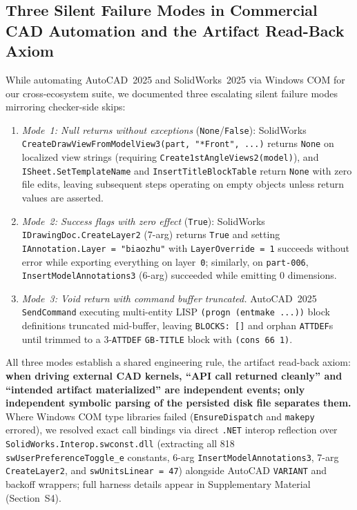 \documentclass[nocopyright,nolists,upint,varvw,hyphenate]{asmejour}
\begin{document}
\subsection{Three Silent Failure Modes in Commercial CAD Automation and the Artifact Read-Back Axiom}\label{sec:cad_silent_failures}

While automating AutoCAD~2025 and SolidWorks~2025 via Windows COM for our cross-ecosystem suite, we documented three escalating silent failure modes mirroring checker-side skips:

\begin{enumerate}
\item \emph{Mode~1: Null returns without exceptions} (\texttt{None}/\texttt{False}): SolidWorks \texttt{CreateDrawView\allowbreak FromModelView3(part, "*Front", ...)} returns \texttt{None} on localized view strings (requiring \texttt{Create1st\allowbreak AngleViews2(model)}), and \texttt{ISheet.\allowbreak SetTemplateName} and \texttt{InsertTitle\allowbreak BlockTable} return \texttt{None} with zero file edits, leaving subsequent steps operating on empty objects unless return values are asserted.
\item \emph{Mode~2: Success flags with zero effect} (\texttt{True}): SolidWorks \texttt{IDrawingDoc.CreateLayer2} (7-arg) returns \texttt{True} and setting \texttt{IAnnotation.Layer = "biaozhu"} with \texttt{LayerOverride = 1} succeeds without error while exporting everything on layer~\texttt{0}; similarly, on \texttt{part-006}, \texttt{InsertModelAnnotations3} (6-arg) succeeded while emitting 0 dimensions.
\item \emph{Mode~3: Void return with command buffer truncated.} AutoCAD~2025 \texttt{SendCommand} executing multi-entity LISP \texttt{(progn (entmake ...))} block definitions truncated mid-buffer, leaving \texttt{BLOCKS: []} and orphan \texttt{ATTDEF}s until trimmed to a 3-\texttt{ATTDEF} \texttt{GB-TITLE} block with \texttt{(cons 66 1)}.
\end{enumerate}

All three modes establish a shared engineering rule, the artifact read-back axiom: \textbf{when driving external CAD kernels, ``API call returned cleanly'' and ``intended artifact materialized'' are independent events; only independent symbolic parsing of the persisted disk file separates them.} Where Windows COM type libraries failed (\texttt{EnsureDispatch} and \texttt{makepy} errored), we resolved exact call bindings via direct \texttt{.NET} interop reflection over \texttt{SolidWorks.Interop.swconst.dll} (extracting all 818 \texttt{swUserPreferenceToggle\_e} constants, 6-arg \texttt{InsertModelAnnotations3}, 7-arg \texttt{CreateLayer2}, and \texttt{swUnitsLinear = 47}) alongside AutoCAD \texttt{VARIANT} and backoff wrappers; full harness details appear in Supplementary Material (Section~S4).
\end{document}
